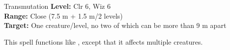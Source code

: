 {Transmutation}
{
	\textbf{Level:}
	Clr 6, Wiz 6\\
	\textbf{Range:}
	Close (7.5 m + 1.5 m/2 levels)\\
	\textbf{Target:}
	One creature/level, no two of which can be more than 9 m apart\\
}
{
	This spell functions like , except that it affects multiple creatures.

}

